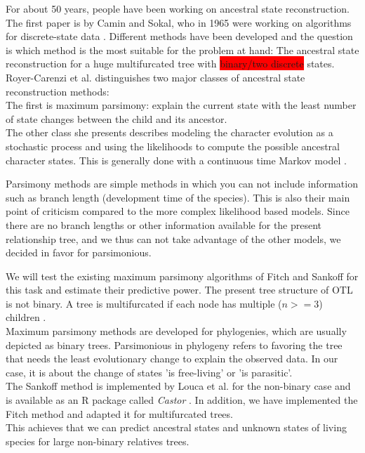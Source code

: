   For about 50 years, people have been working on ancestral state reconstruction. The first paper 
    is by Camin and Sokal, who in 1965 were working on algorithms for discrete-state data 
    \cite{Camin1965}. Different methods have been developed and the question is which method is the 
    most suitable for the problem at hand: The ancestral state reconstruction for a huge 
    multifurcated tree with \colorbox{red}{binary/two discrete} states. \\
  Royer-Carenzi et al. distinguishes two major classes of ancestral state reconstruction methods: \\
  The first is maximum parsimony: explain the current state with the least number of state changes 
    between the child and its ancestor. \\
  The other class she presents describes modeling the character evolution as a stochastic process and 
    using the likelihoods to compute the possible ancestral character states. This is generally done 
    with a continuous time Markov model \cite{RoyerCarenzi2013}.

  Parsimony methods are simple methods in which you can not include information such as branch 
    length (development time of the species). This is also their main point of criticism compared to 
    the more complex likelihood based models. Since there are no branch lengths or other information 
    available for the present relationship tree, and we thus can not take advantage of the 
    other models, we decided in favor for parsimonious.

  We will test the existing maximum parsimony algorithms of Fitch \cite{Fitch1971} and Sankoff 
    \cite{Sankoff1975} for this task and estimate their predictive power. The present tree structure 
    of OTL is not binary. A tree is multifurcated if each node has multiple ($n >= 3$) children 
    \cite{Felsenstein2003}. \\
  Maximum parsimony methods are developed for phylogenies, which are usually depicted as binary trees.
    Parsimonious in phylogeny refers to favoring the tree that needs the least evolutionary change 
    to explain the observed data. In our case, it is about the change of states 'is free-living' or 
    'is parasitic'. \\
  The Sankoff method is implemented by Louca et al. for the non-binary case and is available as an R 
    package called \textit{Castor} \cite{Louca2017}. In addition, we have implemented the Fitch 
    method and adapted it for multifurcated trees. \\%
  This achieves that we can predict ancestral states and unknown states of living species for large 
    non-binary relatives trees.

